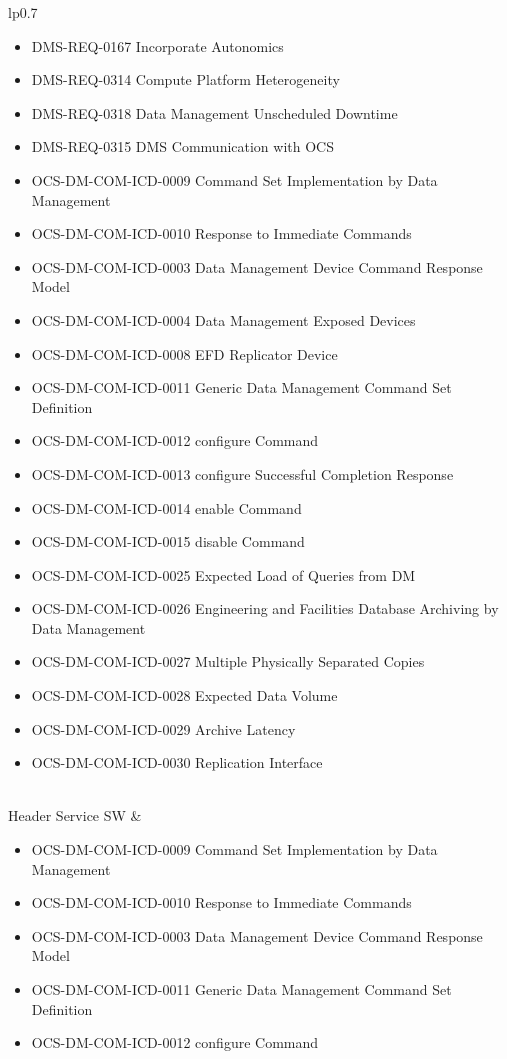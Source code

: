 \begin{xtabular}{lp{0.7\textwidth}}
\begin{itemize}
\item DMS-REQ-0167 Incorporate Autonomics
\item DMS-REQ-0314 Compute Platform Heterogeneity
\item DMS-REQ-0318 Data Management Unscheduled Downtime
\item DMS-REQ-0315 DMS Communication with OCS
\item OCS-DM-COM-ICD-0009 Command Set Implementation by Data Management
\item OCS-DM-COM-ICD-0010 Response to Immediate Commands
\item OCS-DM-COM-ICD-0003 Data Management Device Command Response Model
\item OCS-DM-COM-ICD-0004 Data Management Exposed Devices
\item OCS-DM-COM-ICD-0008 EFD Replicator Device
\item OCS-DM-COM-ICD-0011 Generic Data Management Command Set Definition
\item OCS-DM-COM-ICD-0012 configure Command
\item OCS-DM-COM-ICD-0013 configure Successful Completion Response
\item OCS-DM-COM-ICD-0014 enable Command
\item OCS-DM-COM-ICD-0015 disable Command
\item OCS-DM-COM-ICD-0025 Expected Load of Queries from DM
\item OCS-DM-COM-ICD-0026 Engineering and Facilities Database Archiving by Data Management
\item OCS-DM-COM-ICD-0027 Multiple Physically Separated Copies
\item OCS-DM-COM-ICD-0028 Expected Data Volume
\item OCS-DM-COM-ICD-0029 Archive Latency
\item OCS-DM-COM-ICD-0030 Replication Interface
\end{itemize} \\ \hline
Header Service SW &
\begin{itemize}DMS-REQ-0266 Exposure Catalog
\item OCS-DM-COM-ICD-0009 Command Set Implementation by Data Management
\item OCS-DM-COM-ICD-0010 Response to Immediate Commands
\item OCS-DM-COM-ICD-0003 Data Management Device Command Response Model
\item OCS-DM-COM-ICD-0011 Generic Data Management Command Set Definition
\item OCS-DM-COM-ICD-0012 configure Command

\end{itemize}
\end{xtabular}
